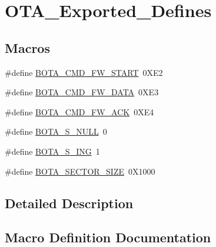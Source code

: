 \hypertarget{group___o_t_a___exported___defines}{}\section{O\+T\+A\+\_\+\+Exported\+\_\+\+Defines}
\label{group___o_t_a___exported___defines}
\subsection*{Macros}
\begin{DoxyCompactItemize}
\item 
\#define \mbox{\hyperlink{group___o_t_a___exported___defines_ga4535ce4bb09ae7816d8e78d56511291a}{B\+O\+T\+A\+\_\+\+C\+M\+D\+\_\+\+F\+W\+\_\+\+S\+T\+A\+RT}}~0\+X\+E2
\item 
\#define \mbox{\hyperlink{group___o_t_a___exported___defines_gac3d822fe5ca5a0a9c76ac0ac4caaebf1}{B\+O\+T\+A\+\_\+\+C\+M\+D\+\_\+\+F\+W\+\_\+\+D\+A\+TA}}~0\+X\+E3
\item 
\#define \mbox{\hyperlink{group___o_t_a___exported___defines_ga890423ccabd280c499bc2bb8f9b7e80e}{B\+O\+T\+A\+\_\+\+C\+M\+D\+\_\+\+F\+W\+\_\+\+A\+CK}}~0\+X\+E4
\item 
\#define \mbox{\hyperlink{group___o_t_a___exported___defines_ga827a638010a299cf6392334b10f4ad19}{B\+O\+T\+A\+\_\+\+S\+\_\+\+N\+U\+LL}}~0
\item 
\#define \mbox{\hyperlink{group___o_t_a___exported___defines_gad572630a2854c436a18db032de30e377}{B\+O\+T\+A\+\_\+\+S\+\_\+\+I\+NG}}~1
\item 
\#define \mbox{\hyperlink{group___o_t_a___exported___defines_gade40ce38a70a0aa2b0b287a9c25f679b}{B\+O\+T\+A\+\_\+\+S\+E\+C\+T\+O\+R\+\_\+\+S\+I\+ZE}}~0\+X1000
\end{DoxyCompactItemize}


\subsection{Detailed Description}


\subsection{Macro Definition Documentation}
\mbox{\label{group___o_t_a___exported___defines_ga890423ccabd280c499bc2bb8f9b7e80e}} 
